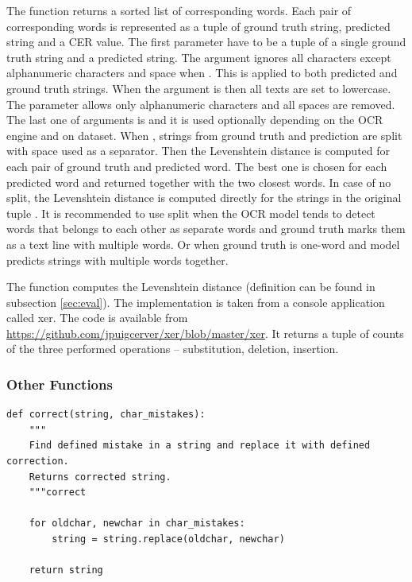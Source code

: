 The function  returns a sorted list of corresponding words. Each pair of corresponding words is represented as a tuple of ground truth string, predicted string and a CER value. The first parameter have to be a tuple of a single ground truth string and a predicted string. The argument  ignores all characters except alphanumeric characters and space when . This is applied to both predicted and ground truth strings. When the argument  is  then all texts are set to lowercase. The  parameter allows only alphanumeric characters and all spaces are removed. The last one of arguments is  and it is used optionally depending on the OCR engine and on dataset. When , strings from ground truth and prediction are split with space used as a separator. Then the Levenshtein distance is computed for each pair of ground truth and predicted word. The best one is chosen for each predicted word and returned together with the two closest words. In case of no split, the Levenshtein distance is computed directly for the strings in the original tuple . It is recommended to use split when the OCR model tends to detect words that belongs to each other as separate words and ground truth marks them as a text line with multiple words. Or when ground truth is one-word and model predicts strings with multiple words together.

The function  computes the Levenshtein distance (definition can be found in subsection \ref*{sec:eval}). The implementation is taken from a console application called xer. The code is available from \url{https://github.com/jpuigcerver/xer/blob/master/xer}. It returns a tuple of counts of the three performed operations --  substitution, deletion, insertion.

\subsubsection*{Other Functions}

\begin{lstlisting}[caption=correct]
def correct(string, char_mistakes):
    """
    Find defined mistake in a string and replace it with defined correction.
    Returns corrected string.
    """correct
    
    for oldchar, newchar in char_mistakes:
        string = string.replace(oldchar, newchar)

    return string
\end{lstlisting}   

